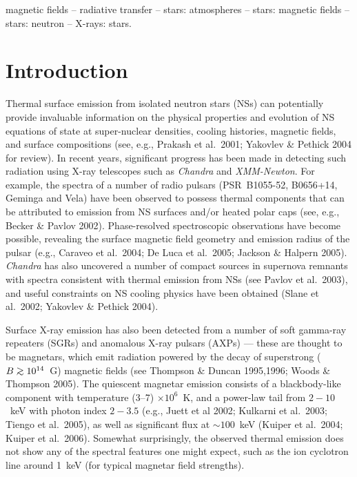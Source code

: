 \documentclass[useAMS,onecolumn,usenatbib,usegraphicx]{mn2e}
\def\go{\mathrel{\raise.3ex\hbox{$>$}\mkern-14mu\lower0.6ex\hbox{$\sim$}}}
\begin{document}
\begin{keywords}
magnetic fields -- radiative transfer -- stars: atmospheres -- stars:
magnetic fields -- stars: neutron -- X-rays: stars.
\end{keywords}


\section{Introduction}
\label{sect:Introduction}

Thermal surface emission from isolated neutron stars
(NSs) \citep[e.g.,][]{Kaspietal05a}
can potentially provide invaluable information on the physical
properties and evolution of NS equations of state at super-nuclear
densities, cooling histories, magnetic fields, and surface
compositions (see, e.g., Prakash et
al.~2001; Yakovlev \& Pethick 2004 for review). 
In recent years, significant progress has been made 
in detecting such radiation using X-ray telescopes 
such as {\it Chandra} and {\it XMM-Newton}.
For example, the spectra of a number of radio pulsars 
(PSR~B1055-52, B0656+14, Geminga and Vela) have been observed to
possess thermal components that can be attributed to emission from NS
surfaces and/or heated polar caps (see, e.g., Becker \& Pavlov
2002). Phase-resolved spectroscopic observations have become 
possible, revealing the surface magnetic field geometry and emission
radius of the pulsar (e.g., Caraveo et al.~2004; De Luca et
al.~2005; Jackson \& Halpern 2005). 
{\it Chandra} has also uncovered a number of compact
sources in supernova remnants with spectra consistent with thermal
emission from NSs (see Pavlov et al.~2003), and useful constraints on
NS cooling physics have been obtained (Slane et al.~2002;
Yakovlev \& Pethick 2004).

Surface X-ray emission has also been detected
from a number of soft gamma-ray repeaters (SGRs) and anomalous X-ray
pulsars (AXPs) --- these are thought to be magnetars, which emit radiation
powered by the decay of superstrong ($B\go 10^{14}$~G) magnetic
fields (see Thompson \& Duncan 1995,1996; Woods \& Thompson 2005).  
The quiescent magnetar emission consists of 
a blackbody-like component with temperature (3--7) $\times 10^6$~K,
and a power-law tail from $2-10$~keV with photon index $2-3.5$
(e.g., Juett et al 2002; Kulkarni et al.~2003; Tiengo et al.~2005),
as well as significant flux at $\sim 100$~keV (Kuiper et al.~2004;
Kuiper et al.~2006). Somewhat surprisingly, the observed 
thermal emission does not show any of the spectral features one might 
expect, such as the ion cyclotron line around 1~keV (for typical magnetar 
field strengths). 
\end{document}
